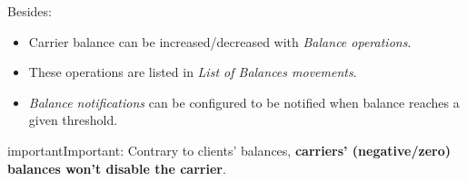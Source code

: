 \documentclass[letterpaper,10pt,english]{sphinxmanual}
\begin{document}
Besides:
\begin{itemize}
\item {} 
Carrier balance can be increased/decreased with \emph{Balance operations}.

\item {} 
These operations are listed in \emph{List of Balances movements}.

\item {} 
\emph{Balance notifications} can be configured to be notified when balance reaches a given threshold.

\end{itemize}

\begin{notice}{important}{Important:}
Contrary to clients' balances, \textbf{carriers' (negative/zero) balances won't disable the carrier}.
\end{notice}
\end{document}

